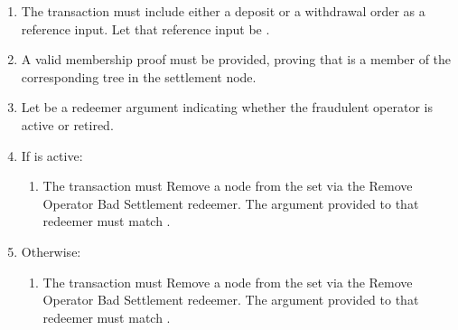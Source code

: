 \documentclass[../midgard.tex]{subfiles}
\begin{document}
\begin{description}
\begin{enumerate}
        \item The transaction must include either a deposit or a withdrawal order as a reference input.
          Let that reference input be .
        \item A valid membership proof must be provided, proving that  is a member of the corresponding tree in the settlement node.
        \item Let  be a redeemer argument indicating whether the fraudulent operator is active or retired.
        \item If  is active:
            \begin{enumerate}
                \item The transaction must Remove a node from the  set via the Remove Operator Bad Settlement redeemer.
                  The  argument provided to that redeemer must match .
            \end{enumerate}
        \item Otherwise:
            \begin{enumerate}
                \item The transaction must Remove a node from the  set via the Remove Operator Bad Settlement redeemer.
                  The  argument provided to that redeemer must match .
            \end{enumerate}
      \end{enumerate}
\end{description}
\end{document}
